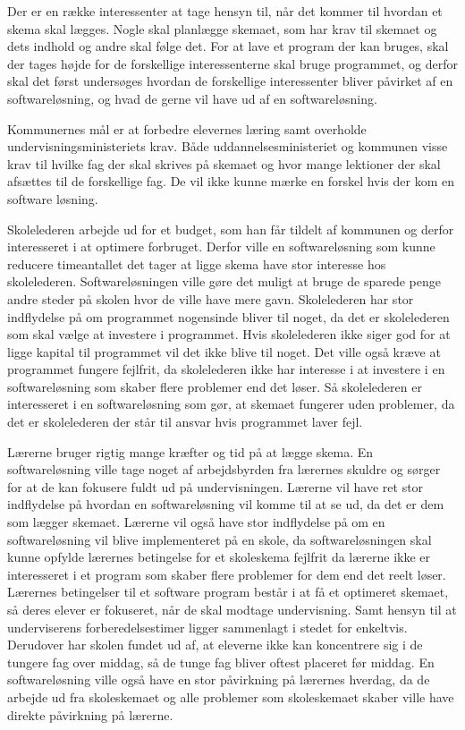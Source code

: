 Der er en række interessenter at tage hensyn til, når det kommer til hvordan et skema skal lægges. Nogle skal planlægge skemaet, som har krav til skemaet og dets indhold og andre skal følge det. For at lave et program der kan bruges, skal der tages højde for de forskellige interessenterne skal bruge programmet, og derfor skal det først undersøges hvordan de forskellige interessenter bliver påvirket af en softwareløsning, og hvad de gerne vil have ud af en softwareløsning. 

Kommunernes mål er at forbedre elevernes læring samt overholde undervisningsministeriets krav. Både uddannelsesministeriet og kommunen visse krav til hvilke fag der skal skrives på skemaet og hvor mange lektioner der skal afsættes til de forskellige fag. De vil ikke kunne mærke en forskel hvis der kom en software løsning.

Skolelederen arbejde ud for et budget, som han får tildelt af kommunen og derfor interesseret i at optimere forbruget. Derfor ville en softwareløsning som kunne reducere timeantallet det tager at ligge skema have stor interesse hos skolelederen. Softwareløsningen ville gøre det muligt at bruge de sparede penge andre steder på skolen hvor de ville have mere gavn. Skolelederen har stor indflydelse på om programmet nogensinde bliver til noget, da det er skolelederen som skal vælge at investere i programmet. Hvis skolelederen ikke siger god for at ligge kapital til programmet vil det ikke blive til noget. Det ville også kræve at programmet fungere fejlfrit, da skolelederen ikke har interesse i at investere i en softwareløsning som skaber flere problemer end det løser. Så skolelederen er interesseret i en softwareløsning som gør, at skemaet fungerer uden problemer, da det er skolelederen der står til ansvar hvis programmet laver fejl. 

Lærerne bruger rigtig mange kræfter og tid på at lægge skema. En softwareløsning ville tage noget af arbejdsbyrden fra lærernes skuldre og sørger for at de kan fokusere fuldt ud på undervisningen. Lærerne vil have ret stor indflydelse på hvordan en softwareløsning vil komme til at se ud, da det er dem som lægger skemaet. Lærerne vil også have stor indflydelse på om en softwareløsning vil blive implementeret på en skole, da softwareløsningen skal kunne opfylde lærernes betingelse for et skoleskema fejlfrit da lærerne ikke er interesseret i et program som skaber flere problemer for dem end det reelt løser. Lærernes betingelser til et software program består i at få et optimeret skemaet, så deres elever er fokuseret, når de skal modtage undervisning. Samt hensyn til at underviserens forberedelsestimer ligger sammenlagt i stedet for enkeltvis. Derudover har skolen fundet ud af, at eleverne ikke kan koncentrere sig i de tungere fag over middag, så de tunge fag bliver oftest placeret før middag. En softwareløsning ville også have en stor påvirkning på lærernes hverdag, da de arbejde ud fra skoleskemaet og alle problemer som skoleskemaet skaber ville have direkte påvirkning på lærerne. 

